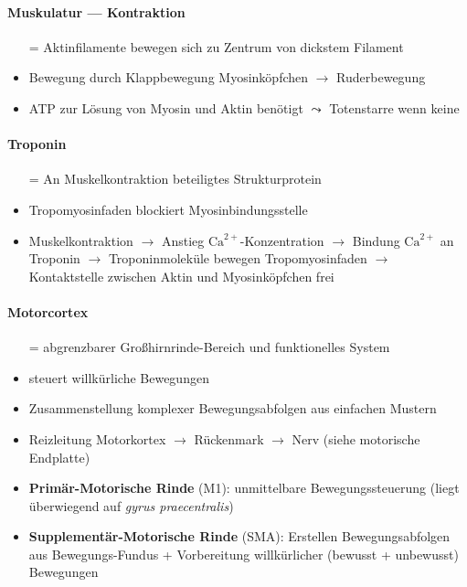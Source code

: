 \paragraph{Muskulatur --- Kontraktion}
\begin{itemize}
  \item[=] Aktinfilamente bewegen sich zu Zentrum von dickstem Filament
  \item Bewegung durch Klappbewegung Myosinköpfchen \( \to \) Ruderbewegung
  \item ATP zur Lösung von Myosin und Aktin benötigt \( \leadsto \) Totenstarre wenn keine
\end{itemize}

\paragraph{Troponin}
\begin{itemize}
  \item[=] An Muskelkontraktion beteiligtes Strukturprotein
  \item Tropomyosinfaden blockiert Myosinbindungsstelle
  \item Muskelkontraktion \( \to \) Anstieg \( \text{Ca}^{2+} \)-Konzentration \( \to \) Bindung \( \text{Ca}^{2+} \) an Troponin \( \to \) Troponinmoleküle bewegen Tropomyosinfaden \( \to \) Kontaktstelle zwischen Aktin und Myosinköpfchen frei 
\end{itemize}

\paragraph{Motorcortex}
\begin{itemize}
  \item[=] abgrenzbarer Großhirnrinde-Bereich und funktionelles System
  \item steuert willkürliche Bewegungen
  \item Zusammenstellung komplexer Bewegungsabfolgen aus einfachen Mustern
  \item Reizleitung Motorkortex \( \to \) Rückenmark \( \to \) Nerv (siehe motorische Endplatte)
  \item \textbf{Primär-Motorische Rinde} (M1): unmittelbare Bewegungssteuerung (liegt überwiegend auf \emph{gyrus praecentralis})
  \item \textbf{Supplementär-Motorische Rinde} (SMA): Erstellen Bewegungsabfolgen aus Bewegungs-Fundus + Vorbereitung willkürlicher (bewusst + unbewusst) Bewegungen
\end{itemize}

